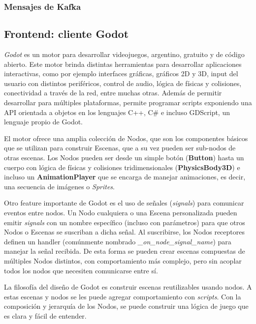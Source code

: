 \subsubsection{Mensajes de Kafka}


\subsection{Frontend: cliente Godot}

\noindent \textit{Godot} es un motor para desarrollar videojuegos, argentino, gratuito y de código abierto. 
Este motor brinda distintas herramientas para desarrollar aplicaciones interactivas, como por ejemplo 
interfaces gráficas, gráficos 2D y 3D, input del usuario con distintos periféricos, control de audio, 
lógica de físicas y colisiones, conectividad a través de la red, entre muchas otras.
Además de permitir desarrollar para múltiples plataformas, permite programar scripts exponiendo una 
API orientada a objetos en los lenguajes C++, C\# e incluso GDScript, un lenguaje propio de Godot.

El motor ofrece una amplia colección de Nodos, que son los componentes básicos que se utilizan para 
construir Escenas, que a su vez pueden ser sub-nodos de otras escenas. Los Nodos pueden ser desde un 
simple botón (\textbf{Button}) hasta un cuerpo con lógica de físicas y colisiones tridimensionales 
(\textbf{PhysicsBody3D}) e incluso un \textbf{AnimationPlayer} que se encarga de manejar animaciones, 
es decir, una secuencia de imágenes o \textit{Sprites}.

Otro feature importante de Godot es el uso de señales (\textit{signals}) para comunicar eventos entre nodos.
Un Nodo cualquiera o una Escena personalizada pueden emitir \textit{signals} con un nombre específico 
(incluso con parámetros) para que otros Nodos o Escenas se suscriban a dicha señal. Al suscribirse, los 
Nodos receptores definen un handler (comúnmente nombrado \textit{\_on\_node\_signal\_name}) para manejar 
la señal recibida. De esta forma se pueden crear escenas compuestas de múltiples Nodos distintos, con 
comportamiento más complejo, pero sin acoplar todos los nodos que necesiten comunicarse entre sí.

La filosofía del diseño de Godot es construir escenas reutilizables usando nodos. A estas escenas y 
nodos se les puede agregar comportamiento con \textit{scripts}. Con la composición y jerarquía de los Nodos, 
se puede construir una lógica de juego que es clara y fácil de entender.

